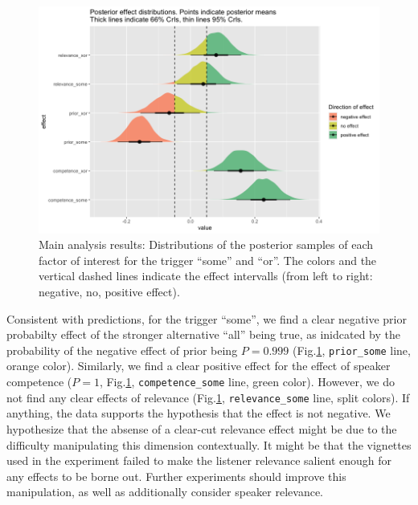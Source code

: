 \documentclass{sp}
\begin{document}
\begin{figure}[t]
	\begin{center}
		\includegraphics[width=1\linewidth]{images/posterior-effects-main.png}
	\end{center}
	\vspace{-0.3cm}
	\caption{Main analysis results: Distributions of the posterior samples of each factor of interest for the trigger ``some'' and ``or''. The colors and the vertical dashed lines indicate the effect intervalls (from left to right: negative, no, positive effect).}
	\label{posteriors-main}
\end{figure}

Consistent with predictions, for the trigger ``some'', we find a clear negative prior probabilty effect of the stronger alternative ``all'' being true, as inidcated by the probability of the negative effect of prior being $P = 0.999$ (Fig.\ref{posteriors-main}, \texttt{prior\_some} line, orange color). Similarly, we find a clear positive effect for the effect of speaker competence ($P =  1$, Fig.\ref{posteriors-main}, \texttt{competence\_some} line, green color). However, we do not find any clear effects of relevance (Fig.\ref{posteriors-main}, \texttt{relevance\_some} line, split colors). If anything, the data supports the hypothesis that the effect is not negative.  
We hypothesize that the absense of a clear-cut relevance effect might be due to the difficulty manipulating this dimension contextually. It might be that the vignettes used in the experiment failed to make the listener relevance salient enough for any effects to be borne out. Further experiments should improve this manipulation, as well as additionally consider speaker relevance.  
\end{document}
